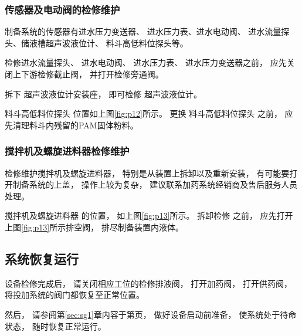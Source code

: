 \documentclass[UTF8,a4paper,12pt,titlepage]{ctexart}
\begin{document}
            

\newpage

        \subsubsection{传感器及电动阀的检修维护} 

         

            制备系统的传感器有进水压力变送器、
            进水压力表、进水电动阀、
            进水流量探头、储液槽超声波液位计、
            料斗高低料位探头等。

            \par 检修进水流量探头、
            进水电动阀、
            进水压力表、
            进水压力变送器之前，
            应先关闭上下游检修截止阀，
            并打开检修旁通阀。
            \par 拆下
            超声波液位计安装座， 
            即可检修
            超声波液位计。

            \newpage

            

            \par 料斗高低料位探头
            位置如上图\ref{fig:p12}所示。
            更换
            料斗高低料位探头
            之前，
            应先清理料斗内残留的PAM固体粉料。
        
        \subsubsection{搅拌机及螺旋进料器检修维护}
            检修维护搅拌机及螺旋进料器，
            特别是从装置上拆卸以及重新安装，
            有可能要打开制备系统的上盖，
            操作上较为复杂，
            建议联系加药系统经销商及售后服务人员处理。

            

            \par 搅拌机及螺旋进料器 的位置，
            如上图\ref{fig:p13}所示。
            拆卸检修 之前，
            应先打开上图\ref{fig:p13}所示排空阀，
            排尽制备装置内液体。

   \subsection{系统恢复运行}
        设备检修完成后，
        请关闭相应工位的检修排液阀，
        打开加药阀，
        打开供药阀，
        将投加系统的阀门都恢复至正常位置。
        \par 然后，
        请参阅第\ref{sec:sg1}章内容于第\pageref{sec:sg1}页，
        做好设备启动前准备，
        使系统处于待命状态，
        随时恢复正常运行。
\end{document}
